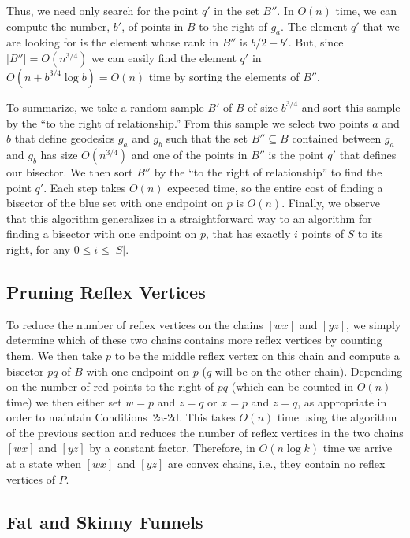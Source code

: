 \documentclass[charterfonts,lotsofwhite]{patmorin}
\newcommand{\chain}[2]{[#1#2]}
\begin{document}
Thus, we need only search for the point $q'$ in the set $B''$.  In
$O(n)$ time, we can compute the number, $b'$, of points in $B$ to the
right of $g_a$.  The element $q'$ that we are looking for is the
element whose rank in $B''$ is $b/2-b'$.  But, since
$|B''|=O(n^{3/4})$ we can easily find the element $q'$ in
$O(n+b^{3/4}\log b) = O(n)$ time by sorting the elements of $B''$. 

To summarize, we take a random sample $B'$ of $B$ of size $b^{3/4}$
and sort this sample by the ``to the right of relationship.''  From
this sample we select two points $a$ and $b$ that define geodesics
$g_a$ and $g_b$ such that the set $B''\subseteq B$ contained between
$g_a$ and $g_b$ has size $O(n^{3/4})$ and one of the points in $B''$
is the point  $q'$ that defines our bisector.  We then sort $B''$ by
the ``to the right of relationship'' to find the point $q'$.  Each
step takes $O(n)$ expected time, so the entire cost of finding a
bisector of the blue set with one endpoint on $p$ is $O(n)$.  Finally,
we observe that this algorithm generalizes in a straightforward way to
an algorithm for finding a bisector with one endpoint on $p$, that has
exactly $i$ points of $S$ to its right, for any $0\le i\le |S|$.

\subsection{Pruning Reflex Vertices}

To reduce the number of reflex vertices on the chains $\chain{w}{x}$
and $\chain{y}{z}$, we simply determine which of these two chains
contains more reflex vertices by counting them.  We then take $p$ to
be the middle reflex vertex on this chain and compute a bisector $pq$
of $B$ with one endpoint on $p$ ($q$ will be on the other chain).
Depending on the number of red points to the right of $pq$ (which can
be counted in $O(n)$ time) we then either set $w=p$ and $z=q$ or $x=p$
and $z=q$, as appropriate in order to maintain Conditions~2a-2d.  This
takes $O(n)$ time using the algorithm of the previous section and
reduces the number of reflex vertices in the two chains $\chain{w}{x}$
and $\chain{y}{z}$ by a constant factor.  Therefore, in $O(n\log k)$
time we arrive at a state when $\chain{w}{x}$ and $\chain{y}{z}$ are
convex chains, i.e., they contain no reflex vertices of $P$.

\subsection{Fat and Skinny Funnels}
\end{document}
